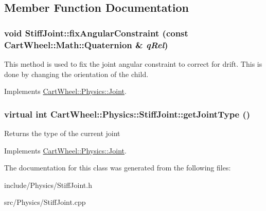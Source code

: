 \subsection{Member Function Documentation}
\hypertarget{classCartWheel_1_1Physics_1_1StiffJoint_a85fb008cc0917d1f2fd7c6d6fbda4331}{
\subsubsection[{fixAngularConstraint}]{\setlength{\rightskip}{0pt plus 5cm}void StiffJoint::fixAngularConstraint (const {\bf CartWheel::Math::Quaternion} \& {\em qRel})}}
\label{classCartWheel_1_1Physics_1_1StiffJoint_a85fb008cc0917d1f2fd7c6d6fbda4331}
This method is used to fix the joint angular constraint to correct for drift. This is done by changing the orientation of the child. 

Implements \hyperlink{classCartWheel_1_1Physics_1_1Joint_ab14f1e87562d9f5993504621d2cf3569}{CartWheel::Physics::Joint}.

\hypertarget{classCartWheel_1_1Physics_1_1StiffJoint_acc1db8ea3775d137500c15daf8921766}{
\subsubsection[{getJointType}]{\setlength{\rightskip}{0pt plus 5cm}virtual int CartWheel::Physics::StiffJoint::getJointType ()}}
\label{classCartWheel_1_1Physics_1_1StiffJoint_acc1db8ea3775d137500c15daf8921766}
Returns the type of the current joint 

Implements \hyperlink{classCartWheel_1_1Physics_1_1Joint_a6940878e260534a3803b14aa697b88f7}{CartWheel::Physics::Joint}.



The documentation for this class was generated from the following files:\begin{DoxyCompactItemize}
\item 
include/Physics/StiffJoint.h\item 
src/Physics/StiffJoint.cpp\end{DoxyCompactItemize}
